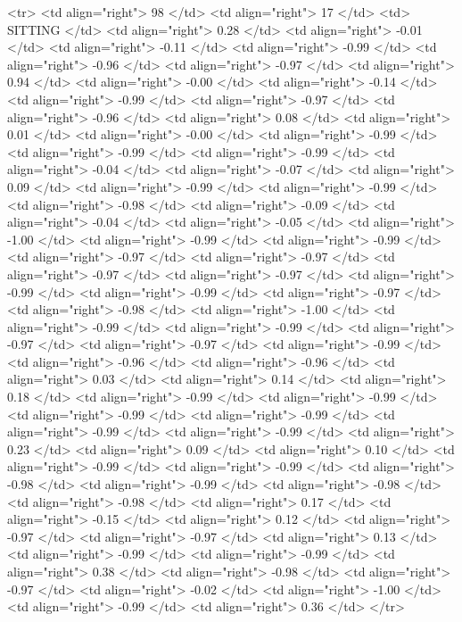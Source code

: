   <tr> <td align="right"> 98 </td> <td align="right">  17 </td> <td> SITTING </td> <td align="right"> 0.28 </td> <td align="right"> -0.01 </td> <td align="right"> -0.11 </td> <td align="right"> -0.99 </td> <td align="right"> -0.96 </td> <td align="right"> -0.97 </td> <td align="right"> 0.94 </td> <td align="right"> -0.00 </td> <td align="right"> -0.14 </td> <td align="right"> -0.99 </td> <td align="right"> -0.97 </td> <td align="right"> -0.96 </td> <td align="right"> 0.08 </td> <td align="right"> 0.01 </td> <td align="right"> -0.00 </td> <td align="right"> -0.99 </td> <td align="right"> -0.99 </td> <td align="right"> -0.99 </td> <td align="right"> -0.04 </td> <td align="right"> -0.07 </td> <td align="right"> 0.09 </td> <td align="right"> -0.99 </td> <td align="right"> -0.99 </td> <td align="right"> -0.98 </td> <td align="right"> -0.09 </td> <td align="right"> -0.04 </td> <td align="right"> -0.05 </td> <td align="right"> -1.00 </td> <td align="right"> -0.99 </td> <td align="right"> -0.99 </td> <td align="right"> -0.97 </td> <td align="right"> -0.97 </td> <td align="right"> -0.97 </td> <td align="right"> -0.97 </td> <td align="right"> -0.99 </td> <td align="right"> -0.99 </td> <td align="right"> -0.97 </td> <td align="right"> -0.98 </td> <td align="right"> -1.00 </td> <td align="right"> -0.99 </td> <td align="right"> -0.99 </td> <td align="right"> -0.97 </td> <td align="right"> -0.97 </td> <td align="right"> -0.99 </td> <td align="right"> -0.96 </td> <td align="right"> -0.96 </td> <td align="right"> 0.03 </td> <td align="right"> 0.14 </td> <td align="right"> 0.18 </td> <td align="right"> -0.99 </td> <td align="right"> -0.99 </td> <td align="right"> -0.99 </td> <td align="right"> -0.99 </td> <td align="right"> -0.99 </td> <td align="right"> -0.99 </td> <td align="right"> 0.23 </td> <td align="right"> 0.09 </td> <td align="right"> 0.10 </td> <td align="right"> -0.99 </td> <td align="right"> -0.99 </td> <td align="right"> -0.98 </td> <td align="right"> -0.99 </td> <td align="right"> -0.98 </td> <td align="right"> -0.98 </td> <td align="right"> 0.17 </td> <td align="right"> -0.15 </td> <td align="right"> 0.12 </td> <td align="right"> -0.97 </td> <td align="right"> -0.97 </td> <td align="right"> 0.13 </td> <td align="right"> -0.99 </td> <td align="right"> -0.99 </td> <td align="right"> 0.38 </td> <td align="right"> -0.98 </td> <td align="right"> -0.97 </td> <td align="right"> -0.02 </td> <td align="right"> -1.00 </td> <td align="right"> -0.99 </td> <td align="right"> 0.36 </td> </tr>
